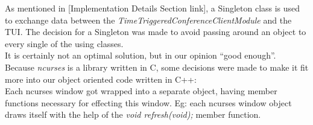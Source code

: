 \noindent
As mentioned in [Implementation Details Section link], a Singleton class is used
to exchange data between the \textit{TimeTriggeredConferenceClientModule} and
the TUI. The decision for a Singleton was made to avoid passing around an object
to every single of the using classes.\\
It is certainly not an optimal solution, but in our opinion ``good enough''.\\

\noindent
Because \textit{ncurses} is a library written in C, some decisions were made to
make it fit more into our object oriented code written in C++:\\
Each ncurses window got wrapped into a separate object, having member functions
necessary for effecting this window. Eg: each ncurses window object draws itself
with the help of the \textit{void refresh(void);} member function.
